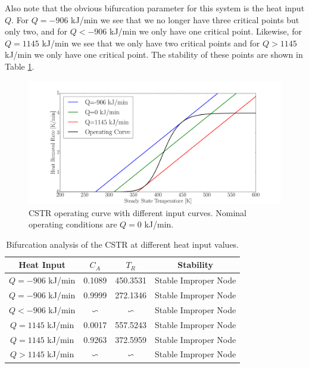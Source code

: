 \documentclass[../masters.tex]{subfiles}
\begin{document}
Also note that the obvious bifurcation parameter for this system is the heat input $Q$. For $Q = -906$ kJ/min we see that we no longer have three critical points but only two, and for $Q < -906$ kJ/min we only have one critical point. Likewise, for $Q = 1145$ kJ/min we see that we only have two critical points and for $Q > 1145$ kJ/min we only have one critical point. The stability of these points are shown in Table \ref{tab_bifurc}.  
\begin{figure}[H] 
\centering
\includegraphics[scale=0.3]{cstr_model_op_curve.pdf}
\caption{CSTR operating curve with different input curves. Nominal operating conditions are $Q=0$ kJ/min.}
\label{fig_cstr_op_curve}
\end{figure}
\begin{table}[H]
\begin{center}
\begin{tabular}{c c c c}
\hline
Heat Input & $C_A$ & $T_R$ & Stability\\
\hline
$Q = -906$ kJ/min & 0.1089 & 450.3531 & Stable Improper Node\\
$Q = -906$ kJ/min & 0.9999 & 272.1346 & Stable Improper Node \\
$Q < -906$ kJ/min & $\backsim$ & $\backsim$ & Stable Improper Node \\
\hline
$Q = 1145$ kJ/min & 0.0017 & 557.5243 & Stable Improper Node\\
$Q = 1145$ kJ/min & 0.9263 & 372.5959 & Stable Improper Node \\
$Q > 1145$ kJ/min & $\backsim$ & $\backsim$ & Stable Improper Node \\
\hline
\end{tabular}
\caption{Bifurcation analysis of the CSTR at different heat input values.}
\label{tab_bifurc}
\end{center}
\end{table}
\end{document}
